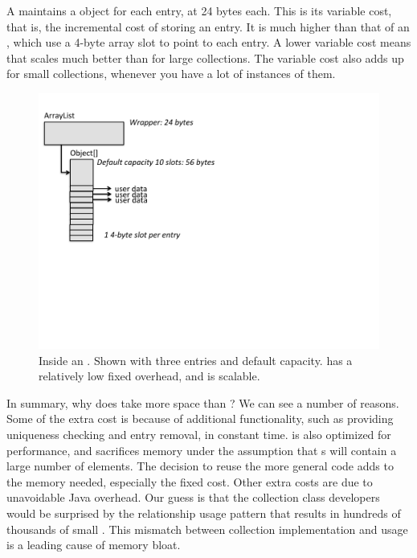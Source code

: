 A  maintains a  object for 
each entry, at 24 bytes each. This is its
variable cost, that is, the incremental cost of storing an
entry. It is much higher than that of an , which
use a 4-byte array slot to point to each entry.
A lower variable cost means that  scales much
better than  for large collections. The variable cost also
adds up for small collections, whenever you have a lot of instances of them.  
 \begin{figure}
  \centering
 \includegraphics[width=.80\textwidth]{part1/Figures/collections/inside-arraylist.pdf}
 \caption{Inside an . Shown with three
 entries and default capacity.  has a relatively low
 fixed overhead, and is scalable.}
  \label{fig:inside-arraylist}
\end{figure}
 

In summary, why does  take more space than ?
We can see a number of reasons. Some of the extra cost is because of
additional functionality, such as providing uniqueness checking and entry
removal, in constant time.
 is also optimized for performance, and sacrifices memory 
under the assumption that s will contain a large number of
elements. The decision
to reuse the more general  code adds to the memory needed,
especially the fixed cost. Other extra costs
are due to unavoidable Java overhead.
Our guess is that the collection class developers would be surprised by the relationship usage
pattern that results in hundreds of thousands of small . 
This mismatch between collection implementation and usage is 
a leading cause of memory bloat. 

